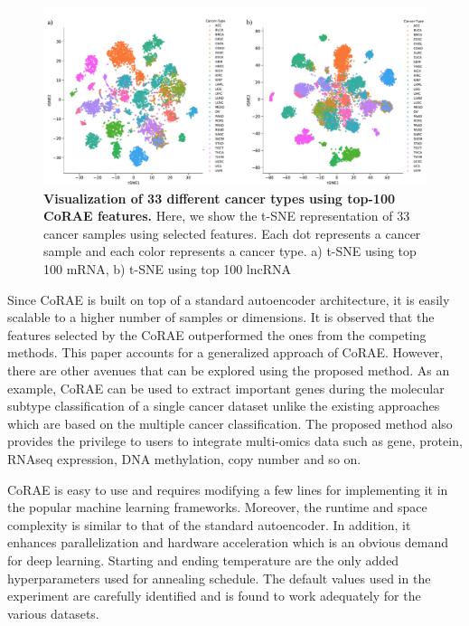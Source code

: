 \documentclass{bioinfo}
\begin{document}
\begin{figure}[bt]
  \centering
  \includegraphics[scale=0.45]{fig/tSNE.pdf}
    \caption{\textbf{Visualization of 33 different cancer types using top-100 CoRAE features.} Here, we show the t-SNE representation of 33 cancer samples using selected features. Each dot represents a cancer sample and each color represents a cancer type. a) t-SNE using top 100 mRNA, b) t-SNE using top 100 lncRNA}
    \label{fig:tsne}
\end{figure}

Since CoRAE is built on top of a standard autoencoder architecture, it is easily scalable to a higher number of samples or dimensions.
It is observed that the features selected by the CoRAE outperformed the ones from the competing methods.
This paper accounts for a generalized approach of CoRAE. However, there are other avenues that can be explored using the proposed method.
As an example, CoRAE can be used to extract important genes during the molecular subtype classification of a single cancer dataset unlike the existing approaches which are based on the multiple cancer classification.
The proposed method also provides the privilege to users to integrate multi-omics data such as gene, protein, RNAseq expression, DNA methylation, copy number and so on. 

CoRAE is easy to use and requires modifying a few lines for implementing it in the popular machine learning frameworks.
Moreover, the runtime and space complexity is similar to that of the standard autoencoder.
In addition, it enhances parallelization and hardware acceleration which is an obvious demand for deep learning.
Starting and ending temperature are the only added hyperparameters used for annealing schedule.
The default values used in the experiment are carefully identified and is found to work adequately for the various datasets.
\end{document}
